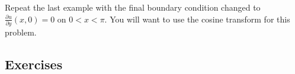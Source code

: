 \begin{exercise}
Repeat the last example with the final boundary condition changed to $\frac{\partial u}{\partial y}(x, 0) = 0$ on $0 < x < \pi$. You will want to use the cosine transform for this problem.
\end{exercise}


\subsection{Exercises}










